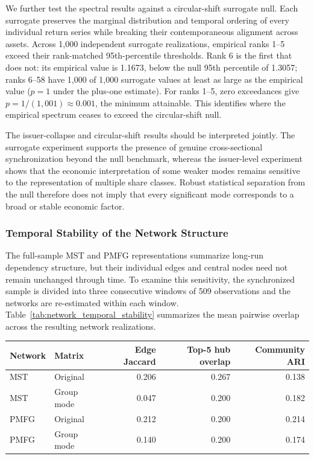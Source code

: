 We further test the spectral results against a circular-shift surrogate null. Each surrogate preserves the marginal distribution and temporal ordering of every individual return series while breaking their contemporaneous alignment across assets. Across 1,000 independent surrogate realizations, empirical ranks 1--5 exceed their rank-matched 95th-percentile thresholds. Rank 6 is the first that does not: its empirical value is 1.1673, below the null 95th percentile of 1.3057; ranks 6--58 have 1,000 of 1,000 surrogate values at least as large as the empirical value ($p=1$ under the plus-one estimate). For ranks 1--5, zero exceedances give $p=1/(1,001)\approx0.001$, the minimum attainable. This identifies where the empirical spectrum ceases to exceed the circular-shift null.

The issuer-collapse and circular-shift results should be interpreted jointly. The surrogate experiment supports the presence of genuine cross-sectional synchronization beyond the null benchmark, whereas the issuer-level experiment shows that the economic interpretation of some weaker modes remains sensitive to the representation of multiple share classes. Robust statistical separation from the null therefore does not imply that every significant mode corresponds to a broad or stable economic factor.

\subsubsection{Temporal Stability of the Network Structure}

The full-sample MST and PMFG representations summarize long-run dependency structure, but their individual edges and central nodes need not remain unchanged through time. To examine this sensitivity, the synchronized sample is divided into three consecutive windows of 509 observations and the networks are re-estimated within each window. Table~\ref{tab:network_temporal_stability} summarizes the mean pairwise overlap across the resulting network realizations.

\begin{center}
\label{tab:network_temporal_stability}

\small
\begin{tabular}{llrrr}
\toprule
Network & Matrix & Edge Jaccard & Top-5 hub overlap & Community ARI \\
\midrule
MST & Original & 0.206 & 0.267 & 0.138 \\
MST & Group mode & 0.047 & 0.200 & 0.182 \\
PMFG & Original & 0.212 & 0.200 & 0.214 \\
PMFG & Group mode & 0.140 & 0.200 & 0.174 \\
\bottomrule
\end{tabular}
\end{center}




